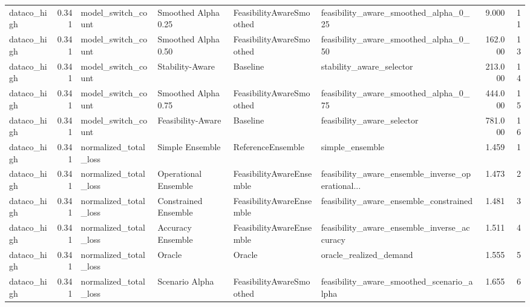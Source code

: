 \begin{table}
{\begin{tabular}{lrllllrr}
   dataco\_high &             0.341 &          model\_switch\_count &   Smoothed Alpha 0.25 &  FeasibilityAwareSmoothed &              feasibility\_aware\_smoothed\_alpha\_0\_25 &         9.000 &              11 \\
   dataco\_high &             0.341 &          model\_switch\_count &   Smoothed Alpha 0.50 &  FeasibilityAwareSmoothed &              feasibility\_aware\_smoothed\_alpha\_0\_50 &       162.000 &              13 \\
   dataco\_high &             0.341 &          model\_switch\_count &       Stability-Aware &                  Baseline &                           stability\_aware\_selector &       213.000 &              14 \\
   dataco\_high &             0.341 &          model\_switch\_count &   Smoothed Alpha 0.75 &  FeasibilityAwareSmoothed &              feasibility\_aware\_smoothed\_alpha\_0\_75 &       444.000 &              15 \\
   dataco\_high &             0.341 &          model\_switch\_count &     Feasibility-Aware &                  Baseline &                         feasibility\_aware\_selector &       781.000 &              16 \\
   dataco\_high &             0.341 &       normalized\_total\_loss &       Simple Ensemble &         ReferenceEnsemble &                                    simple\_ensemble &         1.459 &               1 \\
   dataco\_high &             0.341 &       normalized\_total\_loss &  Operational Ensemble &  FeasibilityAwareEnsemble &  feasibility\_aware\_ensemble\_inverse\_operational... &         1.473 &               2 \\
   dataco\_high &             0.341 &       normalized\_total\_loss &  Constrained Ensemble &  FeasibilityAwareEnsemble &             feasibility\_aware\_ensemble\_constrained &         1.481 &               3 \\
   dataco\_high &             0.341 &       normalized\_total\_loss &     Accuracy Ensemble &  FeasibilityAwareEnsemble &        feasibility\_aware\_ensemble\_inverse\_accuracy &         1.511 &               4 \\
   dataco\_high &             0.341 &       normalized\_total\_loss &                Oracle &                    Oracle &                             oracle\_realized\_demand &         1.555 &               5 \\
   dataco\_high &             0.341 &       normalized\_total\_loss &        Scenario Alpha &  FeasibilityAwareSmoothed &          feasibility\_aware\_smoothed\_scenario\_alpha &         1.655 &               6 \\

\end{tabular}}
\end{table}
